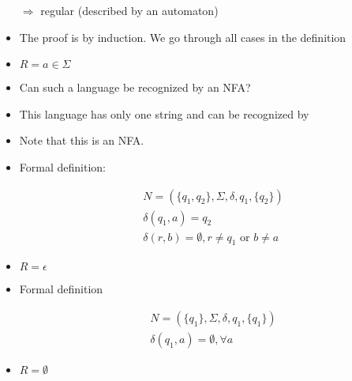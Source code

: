 \begin{frame}[allowframebreaks]
\begin{itemize}
$\Rightarrow$ regular (described by an automaton)
\item The proof is by induction. We go through all cases in the
  definition
\item $R = a \in \Sigma$
\item [] Can such a language be recognized by an NFA?
\item [] This language has only one string and can be recognized by

\begin{center}
\end{center}

\item[] Note that this is an NFA. 
\item[] Formal definition:

  \begin{equation*}
    \begin{split}
& N = (\{q_1,q_2\}, \Sigma, \delta, q_1, \{q_2\}) \\
& \delta(q_1,a)=q_2 \\
& \delta(r,b)=\emptyset, r \neq q_1\mbox{ or } b \neq a
\end{split}
\end{equation*}
\item $R=\epsilon$

\begin{center}
\end{center}
  
\item [] Formal definition

  \begin{equation*}
    \begin{split}
& N=(\{q_1\},\Sigma,\delta, q_1, \{q_1\}) \\
& \delta(q_1,a)=\emptyset, \forall a
\end{split}
\end{equation*}

\item $R=\emptyset$

\begin{center}
\end{center}
  

\end{itemize}
\end{frame}
